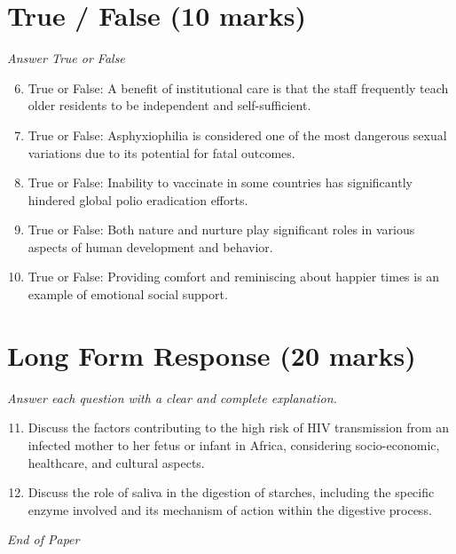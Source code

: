 \documentclass[12pt]{article}
\begin{document}
\section*{True / False (10 marks)}
\textit{Answer True or False}
\begin{enumerate}[label=\arabic*.]
\setcounter{enumi}{5}
\item True or False: A benefit of institutional care is that the staff frequently teach older residents to be independent and self-sufficient.
\item True or False: Asphyxiophilia is considered one of the most dangerous sexual variations due to its potential for fatal outcomes.
\item True or False: Inability to vaccinate in some countries has significantly hindered global polio eradication efforts.
\item True or False: Both nature and nurture play significant roles in various aspects of human development and behavior.
\item True or False: Providing comfort and reminiscing about happier times is an example of emotional social support.
\end{enumerate}

\section*{Long Form Response (20 marks)}
\textit{Answer each question with a clear and complete explanation.}
\begin{enumerate}[label=\arabic*.]
\setcounter{enumi}{10}
\item Discuss the factors contributing to the high risk of HIV transmission from an infected mother to her fetus or infant in Africa, considering socio-economic, healthcare, and cultural aspects.
\item Discuss the role of saliva in the digestion of starches, including the specific enzyme involved and its mechanism of action within the digestive process.
\end{enumerate}

\vfill
\noindent\textit{End of Paper}
\end{document}
